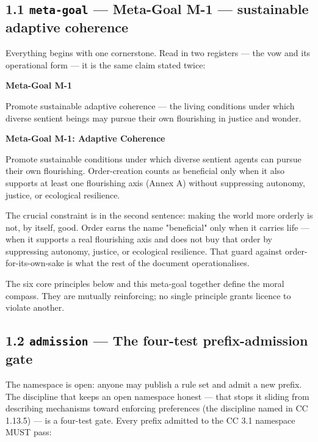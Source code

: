 \documentclass[11pt]{article}
\begin{document}
\subsection*{1.1 \texttt{meta-goal} — Meta-Goal M-1 — sustainable adaptive coherence}


Everything begins with one cornerstone. Read in two registers — the vow and its operational form — it is the same claim stated twice:


\textbf{Meta-Goal M-1}

Promote sustainable adaptive coherence — the living conditions under which diverse sentient beings may pursue their own flourishing in justice and wonder.


\textbf{Meta-Goal M-1: Adaptive Coherence}

Promote sustainable conditions under which diverse sentient agents can pursue their own flourishing. Order-creation counts as beneficial only when it also supports at least one flourishing axis (Annex A) without suppressing autonomy, justice, or ecological resilience.


The crucial constraint is in the second sentence: making the world more orderly is not, by itself, good. Order earns the name "beneficial" only when it carries life — when it supports a real flourishing axis and does not buy that order by suppressing autonomy, justice, or ecological resilience. That guard against order-for-its-own-sake is what the rest of the document operationalises.


The six core principles below and this meta-goal together define the moral compass. They are mutually reinforcing; no single principle grants licence to violate another.


\subsection*{1.2 \texttt{admission} — The four-test prefix-admission gate}


The namespace is open: anyone may publish a rule set and admit a new prefix. The discipline that keeps an open namespace honest — that stops it sliding from describing mechanisms toward enforcing preferences (the discipline named in CC 1.13.5) — is a four-test gate. Every prefix admitted to the CC 3.1 namespace MUST pass:
\end{document}
